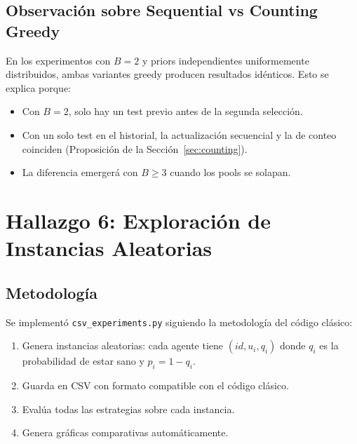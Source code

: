 \documentclass[11pt, a4paper]{article}
\begin{document}
\subsection{Observaci\'on sobre Sequential vs Counting Greedy}

En los experimentos con $B=2$ y priors independientes uniformemente
distribuidos, ambas variantes greedy producen resultados id\'enticos.
Esto se explica porque:
\begin{itemize}[nosep]
    \item Con $B=2$, solo hay un test previo antes de la segunda selecci\'on.
    \item Con un solo test en el historial, la actualizaci\'on secuencial y
    la de conteo coinciden (Proposici\'on de la Secci\'on~\ref{sec:counting}).
    \item La diferencia emerger\'a con $B \geq 3$ cuando los pools se solapan.
\end{itemize}

\section{Hallazgo 6: Exploraci\'on de Instancias Aleatorias}

\subsection{Metodolog\'ia}
Se implement\'o \texttt{csv\_experiments.py} siguiendo la metodolog\'ia del
c\'odigo cl\'asico:
\begin{enumerate}[nosep]
    \item Genera instancias aleatorias: cada agente tiene
    $(id, u_i, q_i)$ donde $q_i$ es la probabilidad de estar sano y
    $p_i = 1 - q_i$.
    \item Guarda en CSV con formato compatible con el c\'odigo cl\'asico.
    \item Eval\'ua todas las estrategias sobre cada instancia.
    \item Genera gr\'aficas comparativas autom\'aticamente.
\end{enumerate}
\end{document}

